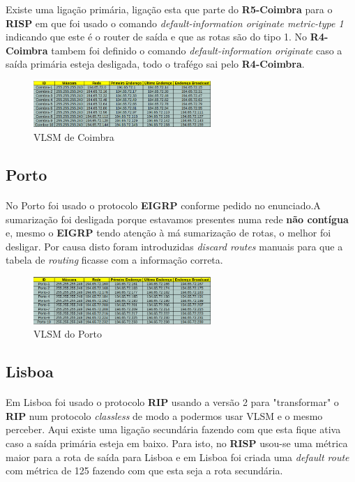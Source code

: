 \documentclass[11pt]{article}
\begin{document}
	Existe uma ligação primária, ligação esta que parte do \textbf{R5-Coimbra} para o \textbf{RISP} em que foi usado o comando \emph{default-information originate metric-type 1} indicando que este é o router de saída e que as rotas são do tipo 1. No \textbf{R4-Coimbra} tambem foi definido o comando \emph{default-information originate} caso a saída primária esteja desligada, todo o trafégo sai pelo \textbf{R4-Coimbra}.

	\begin{figure}[h]
		\centering
		\includegraphics[width=0.6\textwidth]{vlsm-coimbra}
		\caption{VLSM de Coimbra}
		\label{fig.nav}
	\end{figure}

	\pagebreak

	\subsection{Porto}
	\normalsize
	\paragraph{}
	No Porto foi usado o protocolo \textbf{EIGRP} conforme pedido no enunciado.A sumarização foi desligada porque estavamos presentes numa rede \textbf{não contígua} e, mesmo o \textbf{EIGRP} tendo atenção à má sumarização de rotas, o melhor foi desligar. Por causa disto foram introduzidas \emph{discard routes} manuais para que a tabela de \emph{routing} ficasse com a informação correta.

	\begin{figure}[h]
		\centering
		\includegraphics[width=0.6\textwidth]{vlsm-porto}
		\caption{VLSM do Porto}
		\label{fig.nav}
	\end{figure}

	\subsection{Lisboa}
	\normalsize
	\paragraph{}
	Em Lisboa foi usado o protocolo \textbf{RIP} usando a versão 2 para "transformar" o \textbf{RIP} num protocolo \emph{classless} de modo a podermos usar VLSM e o mesmo perceber. Aqui existe uma ligação secundária fazendo com que esta fique ativa caso a saída primária esteja em baixo. Para isto, no \textbf{RISP} usou-se uma métrica maior para a rota de saída para Lisboa e em Lisboa foi criada uma \emph{default route} com métrica de 125 fazendo com que esta seja a rota secundária. 
\end{document}
